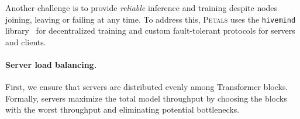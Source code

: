 \begin{table}[tb]
\centering
\caption{Generation throughput (tokens/s) for BLOOM-176B with 8-bit and 16-bit weights on 8$\times$~A100 GPUs.}
\vspace{-5pt}
\label{tbl:memory_footprint}
\label{tab:throughput}
\vspace{-10pt}
\end{table}

Another challenge is to provide \textit{reliable} inference and training despite nodes joining, leaving or failing at any time. To address this, \textsc{Petals} uses the \texttt{hivemind} library~\citep{hivemind} for decentralized training and custom fault-tolerant protocols for servers and clients.


\paragraph{Server load balancing.} First, we ensure that servers are distributed evenly among Transformer blocks. Formally, servers maximize the total model throughput by choosing the blocks with the worst throughput and eliminating potential bottlenecks.


